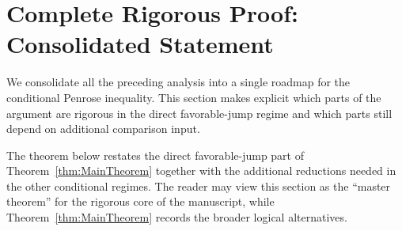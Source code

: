 \section{Complete Rigorous Proof: Consolidated Statement}
\label{sec:Consolidated}

We consolidate all the preceding analysis into a single roadmap for the conditional Penrose inequality. This section makes explicit which parts of the argument are rigorous in the direct favorable-jump regime and which parts still depend on additional comparison input.

\begin{remark}
The theorem below restates the direct favorable-jump part of Theorem~\ref{thm:MainTheorem} together with the additional reductions needed in the other conditional regimes. The reader may view this section as the ``master theorem'' for the rigorous core of the manuscript, while Theorem~\ref{thm:MainTheorem} records the broader logical alternatives.
\end{remark}

